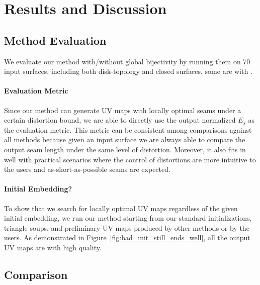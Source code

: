
\section{Results and Discussion}
\label{sec:results}


\subsection{Method Evaluation}

We evaluate our method with/without global bijectivity by running them on 70 input surfaces, including both disk-topology and closed surfaces, some are with .

\paragraph{Evaluation Metric}
Since our method can generate UV maps with locally optimal seams under a certain distortion bound, we are able to directly use the output normalized $E_s$ as the evaluation metric. This metric can be consistent among comparisons against all methods because given an input surface we are always able to compare the output seam length under the same level of distortion. Moreover, it also fits in well with practical scenarios where the control of distortions are more intuitive to the users and as-short-as-possible seams are expected.

\paragraph{Initial Embedding?}
To show that we search for locally optimal UV maps regardless of the given initial embedding, we run our method starting from our standard initializations, triangle soups, and preliminary UV maps produced by other methods or by the users. As demonstrated in Figure~\ref{fig:bad_init_still_ends_well}, all the output UV maps are with high quality.


\subsection{Comparison}

